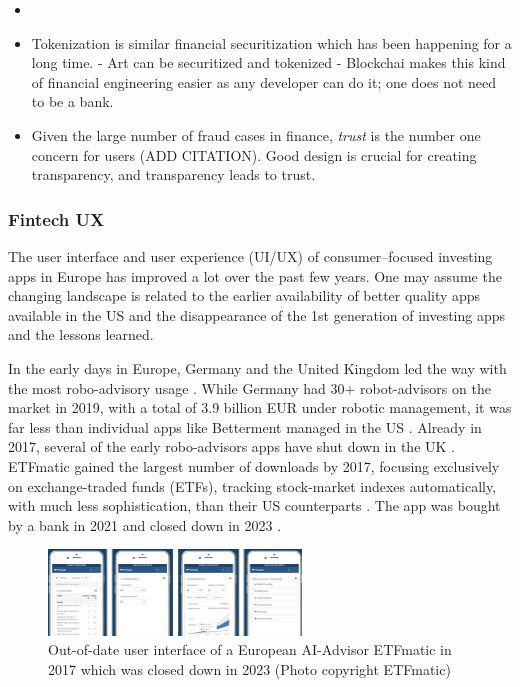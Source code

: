 \documentclass[
  letterpaper,
  DIV=11,
  numbers=noendperiod]{scrartcl}
\providecommand{\tightlist}{%
  \setlength{\itemsep}{0pt}\setlength{\parskip}{0pt}}\usepackage{longtable,booktabs,array}
\begin{document}
\begin{itemize}
\tightlist
\item
  \citet{andresenglerBerkshireHathawayInvests2022}
\item
  Tokenization is similar financial securitization which has been
  happening for a long time. - Art can be securitized and tokenized
  \citet{masterworksHowItWorks2023} - Blockchai makes this kind of
  financial engineering easier as any developer can do it; one does not
  need to be a bank.
\item
  Given the large number of fraud cases in finance, \emph{trust} is the
  number one concern for users (ADD CITATION). Good design is crucial
  for creating transparency, and transparency leads to trust.
\end{itemize}

\subsubsection{Fintech UX}\label{fintech-ux}

The user interface and user experience (UI/UX) of consumer--focused
investing apps in Europe has improved a lot over the past few years. One
may assume the changing landscape is related to the earlier availability
of better quality apps available in the US and the disappearance of the
1st generation of investing apps and the lessons learned.

In the early days in Europe, Germany and the United Kingdom led the way
with the most robo-advisory usage \citep{cowanRoboAdvisersStart2018}.
While Germany had 30+ robot-advisors on the market in 2019, with a total
of 3.9 billion EUR under robotic management, it was far less than
individual apps like Betterment managed in the US
\citep{bankinghubRoboAdvisorNew2019}. Already in 2017, several of the
early robo-advisors apps have shut down in the UK
\citep{altfiETFmaticAppDownloaded2017}. ETFmatic gained the largest
number of downloads by 2017, focusing exclusively on exchange-traded
funds (ETFs), tracking stock-market indexes automatically, with much
less sophistication, than their US counterparts
\citep{altfiETFmaticAppDownloaded2017}. The app was bought by a bank in
2021 and closed down in 2023
\citep{altfiBelgiumAionBank2021, silvaETFmaticReview2023, ETFmaticAccountFunding2023}.

\begin{figure}[H]

{\centering \includegraphics[width=0.6\textwidth,height=\textheight]{./images/etfmatic.png}

}

\caption{Out-of-date user interface of a European AI-Advisor ETFmatic in
2017 which was closed down in 2023 (Photo copyright ETFmatic)}

\end{figure}%
\end{document}
